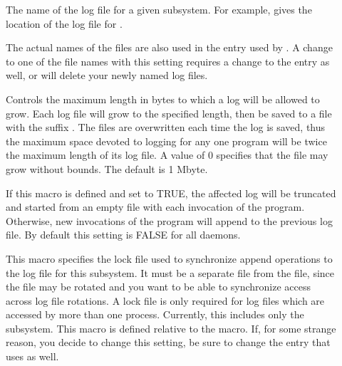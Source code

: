 \begin{description}
  
\item[] \label{param:SubsysLog} The name of
  the log file for a given subsystem.  For example,
   gives the location of the log file for
  .

  The actual names of the files
  are also used in the  entry used by
  .  A change to one of the
  file names with this setting requires a change to the
   entry as well, or  will
  delete your newly named log files.

\item[] \label{param:MaxSubsysLog} Controls
  the maximum length in bytes to which a
  log will be allowed to grow.  Each log file will grow to the
  specified length, then be saved to a file with the suffix
  .  The 
  files are overwritten each time the log is saved, thus the maximum
  space devoted to logging for any one program will be twice the
  maximum length of its log file.  A value of 0 specifies that the
  file may grow without bounds.  The default is 1 Mbyte.

\item[]
  \label{param:TruncSubsysLogOnOpen}  If this macro is defined and set
  to TRUE, the affected log will be truncated and started from an
  empty file with each invocation of the program.  Otherwise, new
  invocations of the program will append to the previous log
  file.  By default this setting is FALSE for all daemons. 

\item[] \label{param:SubsysLock} This macro
  specifies the lock file used to synchronize append operations to the
  log file for this subsystem.  It must be a separate file from the
   file, since the  file may be
  rotated and you want to be able to synchronize access across log
  file rotations.  A lock file is only required for log files which
  are accessed by more than one process.  Currently, this includes
  only the  subsystem.  This macro is defined relative
  to the  macro.  If, for some strange
  reason, you decide to change this setting, be sure to change the
   entry that  uses as well.


\end{description}
